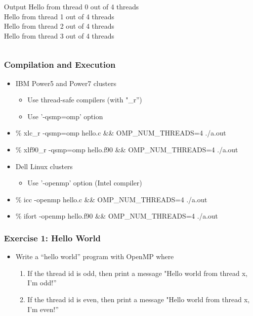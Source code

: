 \documentclass[slidestop,mathserif,compress,xcolor=svgnames]{beamer}
\newenvironment{eblock}[0]
{
\begin{beamerboxesrounded}[upper=uppercol2,lower=lowercol2,shadow=true]}
{\end{beamerboxesrounded}}
\begin{document}
\begin{frame}
\begin{columns}
  \end{columns}
  \vspace{0.8cm}
  \begin{columns}
    \column{5cm}
    \begin{eblock}{Output}
      Hello from thread 0 out of 4 threads\\
      Hello from thread 1 out of 4 threads\\
      Hello from thread 2 out of 4 threads\\
      Hello from thread 3 out of 4 threads
    \end{eblock}
  \end{columns}
\end{frame}

\begin{frame}
  \frametitle{\small Compilation and Execution}
  \begin{itemize}
    \item IBM Power5 and Power7 clusters
    \begin{itemize}
      \item Use thread-safe compilers (with "\_r'')
      \item Use '-qsmp=omp' option
    \end{itemize}
    \item[] \% xlc\_r -qsmp=omp hello.c \&\& OMP\_NUM\_THREADS=4 ./a.out
    \item[] \% xlf90\_r -qsmp=omp hello.f90 \&\& OMP\_NUM\_THREADS=4 ./a.out
    \item Dell Linux clusters
    \begin{itemize}
      \item Use '-openmp' option (Intel compiler)
    \end{itemize}
    \item \% icc -openmp hello.c \&\& OMP\_NUM\_THREADS=4 ./a.out
    \item \% ifort -openmp hello.f90 \&\& OMP\_NUM\_THREADS=4 ./a.out
  \end{itemize}
\end{frame}

\begin{frame}
  \frametitle{\small Exercise 1: Hello World}
  \begin{itemize}
    \item Write a ``hello world'' program with OpenMP where
      \begin{enumerate}
        \item If the thread id is odd, then print a message "Hello world from thread x, I'm odd!''
        \item If the thread id is even, then print a message "Hello world from thread x, I'm even!''
      \end{enumerate}
  \end{itemize}
\end{frame}
\end{document}
